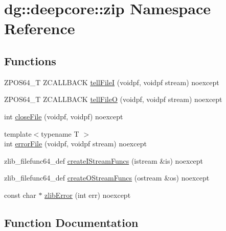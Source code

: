 \hypertarget{namespacedg_1_1deepcore_1_1zip}{}\section{dg\+:\+:deepcore\+:\+:zip Namespace Reference}
\label{namespacedg_1_1deepcore_1_1zip}
\subsection*{Functions}
\begin{DoxyCompactItemize}
\item 
Z\+P\+O\+S64\+\_\+T Z\+C\+A\+L\+L\+B\+A\+CK \hyperlink{namespacedg_1_1deepcore_1_1zip_adbe9432ab30843acf008ac2577c29dae}{tell\+FileI} (voidpf, voidpf stream) noexcept
\item 
Z\+P\+O\+S64\+\_\+T Z\+C\+A\+L\+L\+B\+A\+CK \hyperlink{namespacedg_1_1deepcore_1_1zip_aa425c4e566755e9babe45a89687107e8}{tell\+FileO} (voidpf, voidpf stream) noexcept
\item 
int \hyperlink{namespacedg_1_1deepcore_1_1zip_a1fe80c9e7e16d4a9760fc631549ae913}{close\+File} (voidpf, voidpf) noexcept
\item 
{\footnotesize template$<$typename T $>$ }\\int \hyperlink{namespacedg_1_1deepcore_1_1zip_aa279790cff9536500d73c7f7449aabed}{error\+File} (voidpf, voidpf stream) noexcept
\item 
zlib\+\_\+filefunc64\+\_\+def \hyperlink{namespacedg_1_1deepcore_1_1zip_a14851c251cd9dcb9df38d9ac75edf823}{create\+I\+Stream\+Funcs} (istream \&is) noexcept
\item 
zlib\+\_\+filefunc64\+\_\+def \hyperlink{namespacedg_1_1deepcore_1_1zip_a0791455ea50211ec26eb15071eb0d6ce}{create\+O\+Stream\+Funcs} (ostream \&os) noexcept
\item 
const char $\ast$ \hyperlink{namespacedg_1_1deepcore_1_1zip_a9b3fc24781e6ed1cc6a880afa48dc831}{zlib\+Error} (int err) noexcept
\end{DoxyCompactItemize}


\subsection{Function Documentation}
